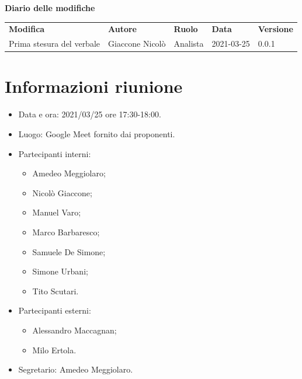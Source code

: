 \documentclass[a4paper]{article}
\begin{document}
    \begin{center}
        \textbf{\Large Diario delle modifiche}\\
        \vspace{10px}
        \begin{table}[h!]
        \centering
        \renewcommand{\arraystretch}{1.8}
        \begin{tabular}{p{150px} p{90px} p{50px} p{60px} p{45px}}
            \rowcolor{logo!70} \textbf{Modifica} & \textbf{Autore} & \textbf{Ruolo} & \textbf{Data} & \textbf{Versione}\\
            Prima stesura del verbale & Giaccone Nicolò & Analista & 2021-03-25 & 0.0.1 \\    
        \end{tabular}
    \end{table}
    \end{center}

    \newpage
    \tableofcontents
    \newpage
    \section{Informazioni riunione}
    \begin{itemize}
        \item Data e ora: 2021/03/25 ore 17:30-18:00.
        \item Luogo: Google Meet fornito dai proponenti.
        \item Partecipanti interni:
        \begin{itemize}
            \item Amedeo Meggiolaro;
            \item Nicolò Giaccone;
            \item Manuel Varo;
            \item Marco Barbaresco;
            \item Samuele De Simone;
            \item Simone Urbani;
            \item Tito Scutari.
        \end{itemize}   
        \item Partecipanti esterni:
        \begin{itemize}
            \item Alessandro Maccagnan;
            \item Milo Ertola.
        \end{itemize}
        \item Segretario: Amedeo Meggiolaro.
    \end{itemize}
\end{document}
